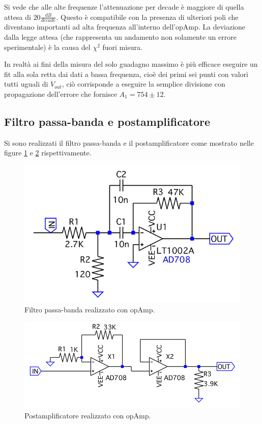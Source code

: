 \documentclass[10pt,a4paper]{article}
\begin{document}
Si vede che alle alte frequenze l'attenuazione per decade è maggiore di quella attesa di $20\frac{dB}{decade}$. Questo è compatibile con la presenza di ulteriori poli che diventano importanti ad alta frequenza all'interno dell'opAmp. La deviazione dalla legge attesa (che rappresenta un andamento non solamente un errore sperimentale) è la causa del $\chi^2$ fuori misura.

In realtà ai fini della misura del solo guadagno massimo è più efficace eseguire un fit alla sola retta dai dati a bassa frequenza, cioè dei primi sei punti con valori tutti uguali di $V_{out}$, ciò corrisponde a eseguire la semplice divisione con propagazione dell'errore che fornisce $A_1 = 754 \pm 12$.

\subsection{Filtro passa-banda e postamplificatore}
Si sono realizzati il filtro passa-banda e il postamplificatore come mostrato nelle figure \ref{banda} e \ref{postamp} rispettivamente.

\begin{figure}[!htb]
\centering
\includegraphics[scale=0.5]{banda.png}
\caption{Filtro passa-banda realizzato con opAmp.\label{banda}}
\end{figure}


\begin{figure}[!htb]
\centering
\includegraphics[scale=0.5]{postamp.png}
\caption{Postamplificatore realizzato con opAmp.\label{postamp}}
\end{figure}
\end{document}
